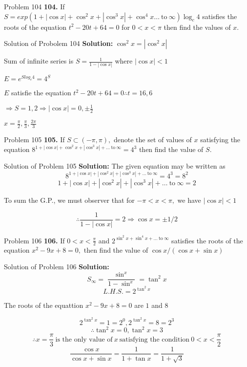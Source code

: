 \documentclass[aspectratio=1610,8pt]{beamer}
\begin{document}
\begin{frame}{Problem 104}
  \textbf{104.} If $S = exp(1 + |\cos x| + \cos^2x + |\cos^3x| + \cos^4x \ldots~\text{to}~\infty)\log_c 4$ satisfies the roots of
  the equation $t^2 - 20t + 64 = 0$ for $0 < x< \pi$ then find the values of $x.$
\end{frame}
\begin{frame}{Solution of Probolem 104}
  \textbf{Solution:} $\cos^2x = |\cos^2x|$

  Sum of infinite series is $S = \frac{1}{1 - |\cos x|}$ where $|\cos x| < 1$

  $E = e^{Slog_e4} = 4^S$

  $E$ satisfie the equation $t^2 - 20t + 64 = 0 \therefore t = 16, 6$

  $\Rightarrow S = 1, 2 \Rightarrow |\cos x| = 0, \pm\frac{1}{2}$

  $x = \frac{\pi}{2}, \frac{\pi}{3}, \frac{2\pi}{3}$
\end{frame}
\begin{frame}{Problem 105}
  \textbf{105.} If $S\subset (-\pi, \pi),$ denote the set of values of $x$ satisfying the equation $8^{1 + |\cos x| + \cos^2x +
    |\cos^3x| + \ldots~\text{to}~\infty} = 4^3$ then find the value of $S.$
\end{frame}
\begin{frame}{Solution of Problem 105}
  \textbf{Solution:} The given equation may be written as
  $$8^{1 + |\cos x| + |\cos^2x| + |\cos^3x| + \ldots~\text{to}~\infty} = 4^3 = 8^2$$
  $$1 + |\cos x| + |\cos^2x| + |\cos^3x| + \ldots~\text{to}~\infty = 2$$

  To sum the G.P., we must observer that for $-\pi < x < \pi,$ we have $|\cos x| < 1$

  $$\therefore \frac{1}{1 - |\cos x|} = 2 \Rightarrow \cos x = \pm1/2$$
\end{frame}
\begin{frame}{Problem 106}
  \textbf{106.} If $0 < x <\frac{\pi}{2}$ and $2^{\sin^2x + \sin^4x + \ldots~\text{to}~\infty}$ satisfies the roots of the equation
  $x^2 - 9x + 8 = 0,$ then find the value of $\cos x/(\cos x + \sin x)$
\end{frame}
\begin{frame}{Solution of Problem 106}
  \textbf{Solution:} $$S_\infty = \frac{\sin^x}{1 - \sin^x} = \tan^2x$$
  $$L.H.S. = 2^{\tan^2x}$$

  The roots of the equattion $x^2 - 9x + 8 = 0$ are $1$ and $8$

  $$2^{\tan^2x} = 1 = 2^0, 2^{\tan^2x} = 8 = 2^3$$
  $$\therefore \tan^2x = 0, \tan^2x = 3$$
  $$\therefore x = \frac{\pi}{3}~\text{is the only value of}~x~\text{satisfying the condition}~0<x<\frac{\pi}{2}$$
  $$\frac{\cos x}{\cos x + \sin x} = \frac{1}{1 + \tan x} = \frac{1}{1 + \sqrt{3}}$$
\end{frame}
\end{document}
